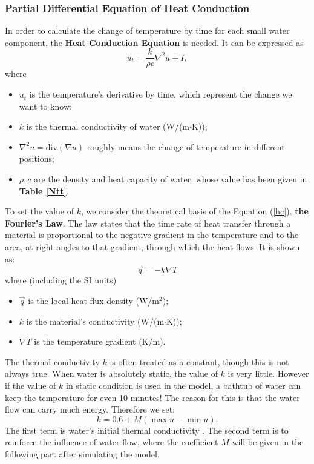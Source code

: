 \documentclass[12pt]{article}
\begin{document}
\subsubsection{Partial Differential Equation of Heat Conduction}\label{k}
In order to calculate the change of temperature by time for each small water component, the
\textbf{Heat Conduction Equation} is needed. It can be expressed as
\begin{equation}\label{hc}
u_{t}=\frac{k}{\rho c}\nabla^2u+I,
\end{equation}
where
\begin{itemize}
    \item {$u_{t}$} is the temperature's derivative by time, which represent the change we want to
    know;
    \item $k$ is the thermal conductivity of water (W/(m$\cdot$K));
    \item $\nabla^2u=\mathrm{div}(\nabla u)$ roughly means the change of temperature in different
    positions;
    \item $\rho,c$  are the density and heat capacity of water, whose value has been given in
    \textbf{Table \ref{Ntt}}.
\end{itemize}

To set the value of $k$, we consider the theoretical basis of the Equation (\ref{hc}), \textbf{the
Fourier's Law}. The law states that the time rate of heat transfer through a material is
proportional to the negative gradient in the temperature and to the area, at right angles to that
gradient, through which the heat flows. It is shown as:
\begin{equation}
\vec q=-k\nabla T
\end{equation}
where (including the SI units)
\begin{itemize}
    \item $ \vec q $  is the local heat flux density (W/m$^2$);
    \item $k$ is the material's conductivity (W/(m$\cdot$K));
    \item ${\nabla T}$ is the temperature gradient (K/m).
\end{itemize}

The thermal conductivity $k$ is often treated as a constant, though this is not always true. When
water is absolutely static, the value of $k$ is very little. However if the value of $k$ in static
condition is used in the model, a bathtub of water can keep the temperature for even 10 minutes! The
reason for this is that the water flow can carry much energy. Therefore we set:
\begin{equation}\label{u}
k=0.6+M(\max u-\min u).
\end{equation}
The first term is water's initial thermal conductivity \cite{11}. The second term is to reinforce
the influence of water flow, where the coefficient $M$ will be given in the following part after
simulating the model.
\end{document}
